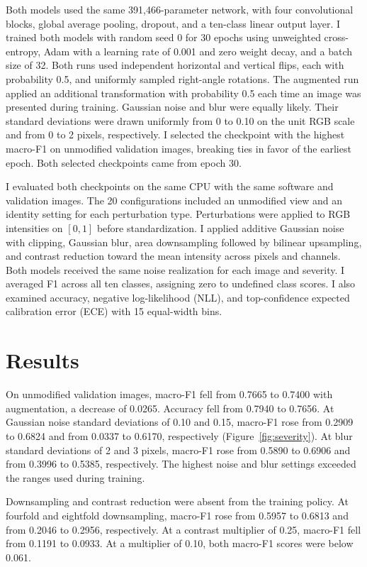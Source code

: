\documentclass[preprint]{aastex701}
\begin{document}
Both models used the same 391,466-parameter network, with four convolutional blocks, global average pooling, dropout, and a ten-class linear output layer. I trained both models with random seed 0 for 30 epochs using unweighted cross-entropy, Adam with a learning rate of 0.001 and zero weight decay, and a batch size of 32. Both runs used independent horizontal and vertical flips, each with probability 0.5, and uniformly sampled right-angle rotations. The augmented run applied an additional transformation with probability 0.5 each time an image was presented during training. Gaussian noise and blur were equally likely. Their standard deviations were drawn uniformly from 0 to 0.10 on the unit RGB scale and from 0 to 2 pixels, respectively. I selected the checkpoint with the highest macro-F1 on unmodified validation images, breaking ties in favor of the earliest epoch. Both selected checkpoints came from epoch 30.

I evaluated both checkpoints on the same CPU with the same software and validation images. The 20 configurations included an unmodified view and an identity setting for each perturbation type. Perturbations were applied to RGB intensities on $[0,1]$ before standardization. I applied additive Gaussian noise with clipping, Gaussian blur, area downsampling followed by bilinear upsampling, and contrast reduction toward the mean intensity across pixels and channels. Both models received the same noise realization for each image and severity. I averaged F1 across all ten classes, assigning zero to undefined class scores. I also examined accuracy, negative log-likelihood (NLL), and top-confidence expected calibration error (ECE) with 15 equal-width bins.

\section{Results}

On unmodified validation images, macro-F1 fell from 0.7665 to 0.7400 with augmentation, a decrease of 0.0265. Accuracy fell from 0.7940 to 0.7656. At Gaussian noise standard deviations of 0.10 and 0.15, macro-F1 rose from 0.2909 to 0.6824 and from 0.0337 to 0.6170, respectively (Figure~\ref{fig:severity}). At blur standard deviations of 2 and 3 pixels, macro-F1 rose from 0.5890 to 0.6906 and from 0.3996 to 0.5385, respectively. The highest noise and blur settings exceeded the ranges used during training.

Downsampling and contrast reduction were absent from the training policy. At fourfold and eightfold downsampling, macro-F1 rose from 0.5957 to 0.6813 and from 0.2046 to 0.2956, respectively. At a contrast multiplier of 0.25, macro-F1 fell from 0.1191 to 0.0933. At a multiplier of 0.10, both macro-F1 scores were below 0.061.
\end{document}
